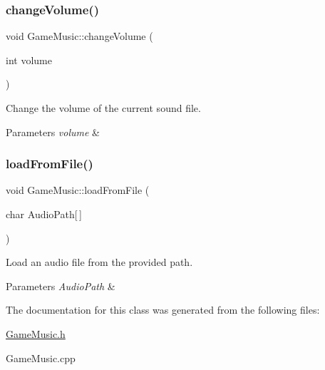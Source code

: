 \subsubsection{\texorpdfstring{change\+Volume()}{changeVolume()}}
{\footnotesize\ttfamily void Game\+Music\+::change\+Volume (\begin{DoxyParamCaption}\item[{int}]{volume }\end{DoxyParamCaption})}



Change the volume of the current sound file. 


\begin{DoxyParams}{Parameters}
{\em volume} & \\
\hline
\end{DoxyParams}
\mbox{\label{class_game_music_a47a770430dc1213a4b31ab0353549018}} 
\subsubsection{\texorpdfstring{load\+From\+File()}{loadFromFile()}}
{\footnotesize\ttfamily void Game\+Music\+::load\+From\+File (\begin{DoxyParamCaption}\item[{char}]{Audio\+Path\mbox{[}$\,$\mbox{]} }\end{DoxyParamCaption})}



Load an audio file from the provided path. 


\begin{DoxyParams}{Parameters}
{\em Audio\+Path} & \\
\hline
\end{DoxyParams}


The documentation for this class was generated from the following files\+:\begin{DoxyCompactItemize}
\item 
\hyperlink{_game_music_8h}{Game\+Music.\+h}\item 
Game\+Music.\+cpp\end{DoxyCompactItemize}
